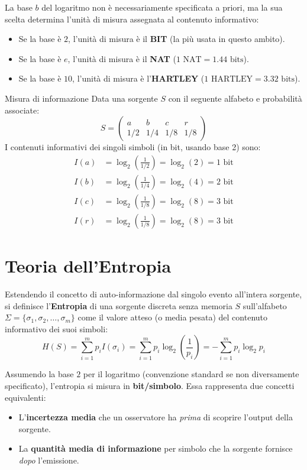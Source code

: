 La base $b$ del logaritmo non è necessariamente specificata a priori, ma la sua scelta determina l'unità di misura assegnata al contenuto informativo:
\begin{itemize}
    \item Se la base è $2$, l'unità di misura è il \textbf{BIT} (la più usata in questo ambito).
    \item Se la base è $e$, l'unità di misura è il \textbf{NAT} ($1 \text{ NAT} = 1.44 \text{ bits}$).
    \item Se la base è $10$, l'unità di misura è l'\textbf{HARTLEY} ($1 \text{ HARTLEY} = 3.32 \text{ bits}$).
\end{itemize}

\begin{esempio}{Misura di informazione}
Data una sorgente $S$ con il seguente alfabeto e probabilità associate:
\[ S = \begin{pmatrix} a & b & c & r \\ 1/2 & 1/4 & 1/8 & 1/8 \end{pmatrix} \]
I contenuti informativi dei singoli simboli (in bit, usando base 2) sono:
\begin{align*}
    I(a) &= \log_2\left(\frac{1}{1/2}\right) = \log_2(2) = 1 \text{ bit} \\
    I(b) &= \log_2\left(\frac{1}{1/4}\right) = \log_2(4) = 2 \text{ bit} \\
    I(c) &= \log_2\left(\frac{1}{1/8}\right) = \log_2(8) = 3 \text{ bit} \\
    I(r) &= \log_2\left(\frac{1}{1/8}\right) = \log_2(8) = 3 \text{ bit}
\end{align*}
\end{esempio}
\section{Teoria dell'Entropia}

Estendendo il concetto di auto-informazione dal singolo evento all'intera sorgente, si definisce l'\textbf{Entropia} di una sorgente discreta senza memoria $S$ sull'alfabeto $\Sigma = \{\sigma_1, \sigma_2, \dots, \sigma_m\}$ come il valore atteso (o media pesata) del contenuto informativo dei suoi simboli:
\[ H(S) = \sum_{i=1}^{m} p_i I(\sigma_i) = \sum_{i=1}^{m} p_i \log_2 \left( \frac{1}{p_i} \right) = - \sum_{i=1}^{m} p_i \log_2 p_i \]

Assumendo la base $2$ per il logaritmo (convenzione standard se non diversamente specificato), l'entropia si misura in \textbf{bit/simbolo}. Essa rappresenta due concetti equivalenti:
\begin{itemize}
    \item L'\textbf{incertezza media} che un osservatore ha \textit{prima} di scoprire l'output della sorgente.
    \item La \textbf{quantità media di informazione} per simbolo che la sorgente fornisce \textit{dopo} l'emissione.
\end{itemize}

